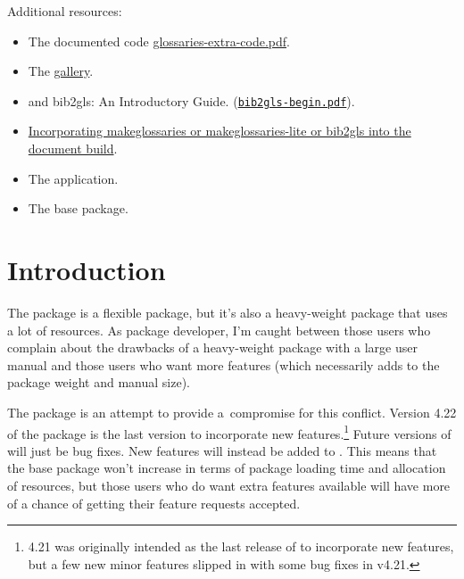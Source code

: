 \documentclass[report,inlinetitle,noprint]{nlctdoc}
\begin{document}
Additional resources:
\begin{itemize}
\item The  documented code
\href{http://mirrors.ctan.org/macros/latex/contrib/glossaries-extra/glossaries-extra-code.pdf}{glossaries-extra-code.pdf}.

\item The
\href{http://www.dickimaw-books.com/gallery/#glossaries-extra}{ gallery}.

\item {} and \gls{bib2gls}: An Introductory
Guide. (\href{http://mirrors.ctan.org/support/bib2gls/bib2gls-begin.pdf}{\texttt{bib2gls-begin.pdf}}).

\item
\href{https://www.dickimaw-books.com/latex/buildglossaries/}{Incorporating
makeglossaries or makeglossaries-lite or bib2gls into the document
build}.

\item The
\href{http://www.dickimaw-books.com/software/bib2gls}{}
application.

\item The base \href{https://ctan.org/pkg/glossaries}{} package.
\end{itemize}

\tableofcontents

\chapter{Introduction}
\label{sec:intro}

The  package is a flexible package, but it's also a
heavy-weight package that uses a lot of resources. As package
developer, I'm caught between those users who complain about the
drawbacks of a heavy-weight package with a large user manual and
those users who want more features (which necessarily adds to the
package weight and manual size).

The  package is an attempt to provide
a~compromise for this
conflict. Version 4.22 of the  package is
the last version to incorporate new features.\footnote{4.21 was
originally intended as the last release of  to
incorporate new features, but a few new minor features slipped in with
some bug fixes in v4.21.} Future versions of
 will just be bug fixes. New features will
instead be added to .
This means that the base  package won't increase
in terms of package loading time and allocation of resources, but
those users who do want extra features available will have more of a
chance of getting their feature requests accepted.
\end{document}
